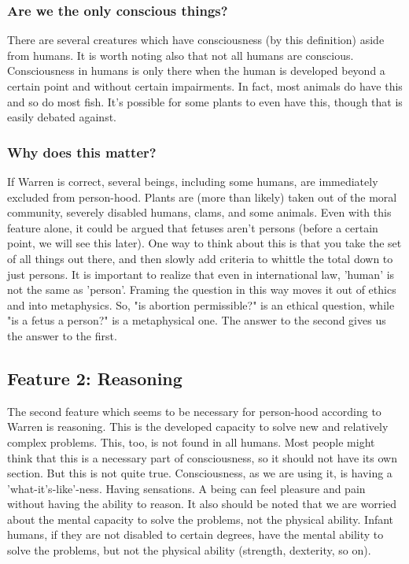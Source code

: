 \subsubsection{Are we the only conscious things?}

There are several creatures which have consciousness (by this definition) aside from humans. It is worth noting also that not all humans are conscious. Consciousness in humans is only there when the human is developed beyond a certain point and without certain impairments. In fact, most animals do have this and so do most fish. It's possible for some plants to even have this, though that is easily debated against.

\subsubsection{Why does this matter?}

If Warren is correct, several beings, including some humans, are immediately excluded from person-hood. Plants are (more than likely) taken out of the moral community, severely disabled humans, clams, and some animals. Even with this feature alone, it could be argued that fetuses aren't persons (before a certain point, we will see this later). One way to think about this is that you take the set of all things out there, and then slowly add criteria to whittle the total down to just persons. It is important to realize that even in international law, 'human' is not the same as 'person'.  Framing the question in this way moves it out of ethics and into metaphysics. So, "is abortion permissible?" is an ethical question, while "is a fetus a person?" is a metaphysical one. The answer to the second gives us the answer to the first.

\subsection{Feature 2: Reasoning}

The second feature which seems to be necessary for person-hood according to Warren is reasoning. This is the developed capacity to solve new and relatively complex problems. This, too, is not found in all humans. Most people might think that this is a necessary part of consciousness, so it should not have its own section. But this is not quite true. Consciousness, as we are using it, is having a 'what-it's-like'-ness. Having sensations. A being can feel pleasure and pain without having the ability to reason. It also should be noted that we are worried about the mental capacity to solve the problems, not the physical ability. Infant humans, if they are not disabled to certain degrees, have the mental ability to solve the problems, but not the physical ability (strength, dexterity, so on).

